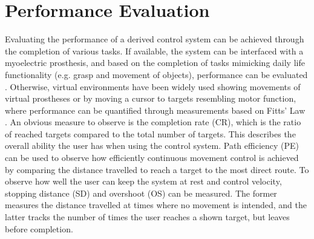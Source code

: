 \section{Performance Evaluation}

Evaluating the performance of a derived control system can be achieved through the completion of various tasks. If available, the system can be interfaced with a myoelectric prosthesis, and based on the completion of tasks mimicking daily life functionality (e.g. grasp and movement of objects), performance can be evaluated \cite{Mastinu2018}. Otherwise, virtual environments have been widely used showing movements of virtual prostheses \cite{Powell2014} or by moving a cursor to targets resembling motor function, where performance can be quantified through measurements based on Fitts' Law \cite{Scheme2013,Wurth2014,Hahne2014}. An obvious measure to observe is the completion rate (CR), which is the ratio of reached targets compared to the total number of targets. This describes the overall ability the user has when using the control system. Path efficiency (PE) can be used to observe how efficiently continuous movement control is achieved by comparing the distance travelled to reach a target to the most direct route. To observe how well the user can keep the system at rest and control velocity, stopping distance (SD) and overshoot (OS) can be measured. The former measures the distance travelled at times where no movement is intended, and the latter tracks the number of times the user reaches a shown target, but leaves before completion. \cite{Scheme2013}
